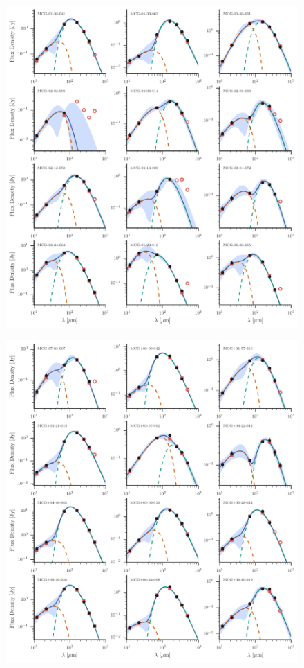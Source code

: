 \begin{figure}
\centering
\includegraphics[width=\textwidth]{figures/sedfig14}
\caption{}
\end{figure}

\begin{figure}
\centering
\includegraphics[width=\textwidth]{figures/sedfig15}
\caption{}
\end{figure}

